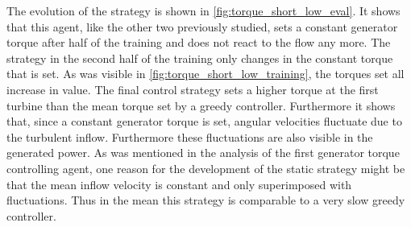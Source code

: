 The evolution of the strategy is shown in \autoref{fig:torque_short_low_eval}. It shows that this agent, like the other two previously studied, sets a constant generator torque after half of the training and does not react to the flow any more. The strategy in the second half of the training only changes in the constant torque that is set. As was visible in \autoref{fig:torque_short_low_training}, the torques set all increase in value. The final control strategy sets a higher torque at the first turbine than the mean torque set by a greedy controller. Furthermore it shows that, since a constant generator torque is set, angular velocities fluctuate due to the turbulent inflow. Furthermore these fluctuations are also visible in the generated power. As was mentioned in the analysis of the first generator torque controlling agent, one reason for the development of the static strategy might be that the mean inflow velocity is constant and only superimposed with fluctuations. Thus in the mean this strategy is comparable to a very slow greedy controller.
